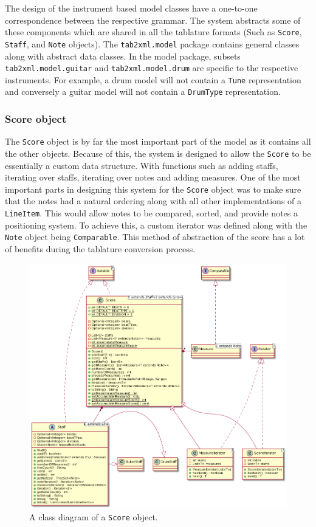 \documentclass[11pt]{article}
\begin{document}
The design of the instrument based model classes have a one-to-one correspondence between the respective grammar. The system abstracts some of these components which are shared in all the tablature formats (Such as \texttt{Score}, \texttt{Staff}, and \texttt{Note} objects). The \texttt{tab2xml.model} package contains general classes along with abstract data classes. In the model package, subsets \texttt{tab2xml.model.guitar} and \texttt{tab2xml.model.drum} are specific to the respective instruments. For example, a drum model will not contain a \texttt{Tune} representation and conversely a guitar model will not contain a \texttt{DrumType} representation.

\subsubsection{Score object}
\label{sec:org1b879ee}
The \texttt{Score} object is by far the most important part of the model as it contains all the other objects. Because of this, the system is designed to allow the \texttt{Score} to be essentially a custom data structure. With functions such as adding staffs, iterating over staffs, iterating over notes and adding measures. One of the most important parts in designing this system for the \texttt{Score} object was to make sure that the notes had a natural ordering along with all other implementations of a \texttt{LineItem}. This would allow notes to be compared, sorted, and provide notes a positioning system. To achieve this, a custom iterator was defined along with the \texttt{Note} object being \texttt{Comparable}. This method of abstraction of the score has a lot of benefits during the tablature conversion process.
\begin{figure}[htbp]
\centering
\includegraphics[width=.9\linewidth]{./Diagrams/backend-score-diagram.png}
\caption{A class diagram of a \texttt{Score} object.}
\end{figure}
\end{document}
